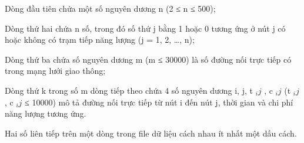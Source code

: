 Dòng đầu tiên chứa một số nguyên dương n (2 ≤ n ≤ 500);

Dòng thứ hai chứa n số, trong đó số thứ j bằng 1 hoặc 0 tương ứng ở nút j có hoặc không có trạm tiếp năng lượng (j = 1, 2, …, n);

Dòng thứ ba chứa số nguyên dương m (m ≤ 30000) là số đường nối trực tiếp có trong mạng lưới giao thông;

Dòng thứ k trong số m dòng tiếp theo chứa 4 số nguyên dương i, j, t $_ ij $ , c $_ ij $ (t $_ ij $ , c $_ ij $ ≤ 10000) mô tả đường nối trực tiếp từ nút i đến nút j, thời gian và chi phí năng lượng tương ứng.

Hai số liên tiếp trên một dòng trong file dữ liệu cách nhau ít nhất một dấu cách.

\